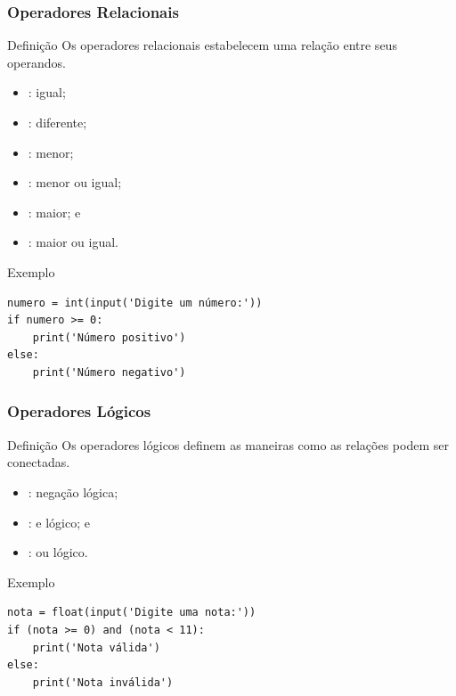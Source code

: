 \documentclass{beamer}
\begin{document}
\begin{frame}[fragile]
\frametitle{Operadores Relacionais}

\begin{block}{Definição}
	Os operadores relacionais estabelecem uma relação entre seus operandos.
\end{block} \vfill

\begin{itemize}
	\item \structure{==} : igual;
	\item \structure{!=} : diferente;
	\item \structure{<} : menor;
	\item \structure{<=} : menor ou igual;
	\item \structure{>} : maior; e
	\item \structure{>=} : maior ou igual.
\end{itemize}\vfill

\begin{exampleblock}{Exemplo}
	\begin{lstlisting}
numero = int(input('Digite um número:'))
if numero >= 0:
    print('Número positivo')
else:
    print('Número negativo')
	\end{lstlisting}
\end{exampleblock}

\end{frame}

\begin{frame}[fragile]
\frametitle{Operadores Lógicos}

\begin{block}{Definição}
Os operadores lógicos definem as maneiras como as relações podem ser conectadas.
\end{block} \vfill

\begin{itemize}
	\item {} : negação lógica;
	\item {} : e lógico; e
	\item {} : ou lógico.
\end{itemize}\vfill

\begin{exampleblock}{Exemplo}
	\begin{lstlisting}
nota = float(input('Digite uma nota:'))
if (nota >= 0) and (nota < 11):
    print('Nota válida')
else:
    print('Nota inválida')
	\end{lstlisting}
\end{exampleblock}
\end{frame}
\end{document}
